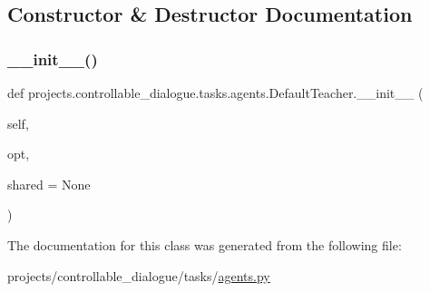 \subsection{Constructor \& Destructor Documentation}
\mbox{\label{classprojects_1_1controllable__dialogue_1_1tasks_1_1agents_1_1DefaultTeacher_a7e4547b329d721d43fda08c58a5e901c}} 
\subsubsection{\texorpdfstring{\+\_\+\+\_\+init\+\_\+\+\_\+()}{\_\_init\_\_()}}
{\footnotesize\ttfamily def projects.\+controllable\+\_\+dialogue.\+tasks.\+agents.\+Default\+Teacher.\+\_\+\+\_\+init\+\_\+\+\_\+ (\begin{DoxyParamCaption}\item[{}]{self,  }\item[{}]{opt,  }\item[{}]{shared = {\ttfamily None} }\end{DoxyParamCaption})}



The documentation for this class was generated from the following file\+:\begin{DoxyCompactItemize}
\item 
projects/controllable\+\_\+dialogue/tasks/\hyperlink{projects_2controllable__dialogue_2tasks_2agents_8py}{agents.\+py}\end{DoxyCompactItemize}
